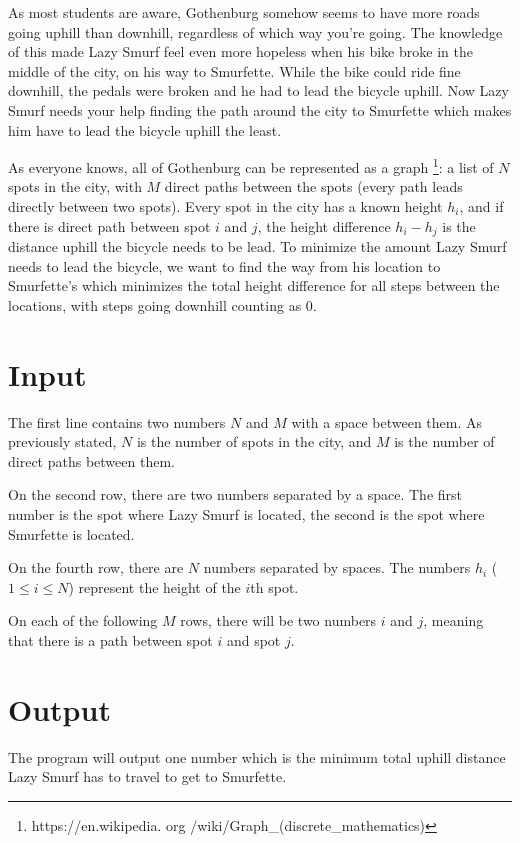 
As most students are aware, Gothenburg somehow seems to have more roads going uphill than downhill,
regardless of which way you're going. The knowledge of this made Lazy Smurf feel even more hopeless
when his bike broke in the middle of the city, on his way to Smurfette. While the bike could ride
fine downhill, the pedals were broken and he had to lead the bicycle uphill. Now Lazy Smurf needs
your help finding the path around the city to Smurfette which makes him have to lead the bicycle
uphill the least.

As everyone knows, all of Gothenburg can be represented as a graph \footnote{https://en.wikipedia.
org /wiki/Graph_(discrete_mathematics)}: a list of $N$ spots in the city, with $M$ direct paths
between the spots (every path leads directly between two spots). Every spot in the city has a known
height $h_i$, and if there is direct path between spot $i$ and $j$, the height difference $h_i-h_j$
is the distance uphill the bicycle needs to be lead. To minimize the amount Lazy Smurf needs to lead
the bicycle, we want to find the way from his location to Smurfette's which minimizes the total
height difference for all steps between the locations, with steps going downhill counting as 0.

\section*{Input}
The first line contains two numbers $N$ and $M$ with a space between them. As previously stated, $N$
is the number of spots in the city, and $M$ is the number of direct paths between them.

On the second row, there are two numbers separated by a space. The first number is the spot where
Lazy Smurf is located, the second is the spot where Smurfette is located.

On the fourth row, there are $N$ numbers separated by spaces. The numbers $h_i$ ($1 \le i \le N$)
represent the height of the $i$th spot.

On each of the following $M$ rows, there will be two numbers $i$ and $j$, meaning that there is a
path between spot $i$ and spot $j$.

\section*{Output}

The program will output one number which is the minimum total uphill distance Lazy Smurf has to
travel to get to Smurfette.

